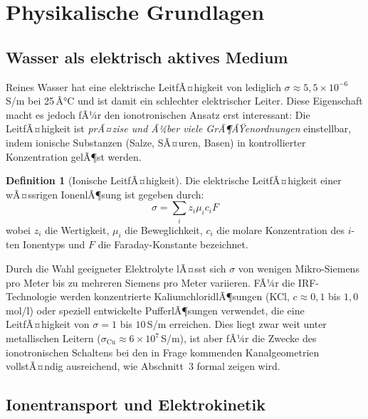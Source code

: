 ﻿\documentclass[a4paper,12pt]{scrreprt}
\theoremstyle{definition}
\newtheorem{definition}{Definition}[section]
\begin{document}
\section{Physikalische Grundlagen}

\subsection{Wasser als elektrisch aktives Medium}

Reines Wasser hat eine elektrische LeitfÃ¤higkeit von lediglich
$\sigma \approx 5{,}5 \times 10^{-6}$\,S/m bei 25\,Â°C und ist damit
ein schlechter elektrischer Leiter. Diese Eigenschaft macht es jedoch
fÃ¼r den ionotronischen Ansatz erst interessant: Die LeitfÃ¤higkeit ist
\emph{prÃ¤zise und Ã¼ber viele GrÃ¶ÃŸenordnungen} einstellbar, indem ionische
Substanzen (Salze, SÃ¤uren, Basen) in kontrollierter Konzentration gelÃ¶st werden.

\begin{definition}[Ionische LeitfÃ¤higkeit]
	Die elektrische LeitfÃ¤higkeit einer wÃ¤ssrigen IonenlÃ¶sung ist gegeben durch:
	\begin{equation}
		\sigma = \sum_i z_i \mu_i c_i F
		\label{eq:leitfaehigkeit}
	\end{equation}
	wobei $z_i$ die Wertigkeit, $\mu_i$ die Beweglichkeit, $c_i$ die molare
	Konzentration des $i$-ten Ionentyps und $F$ die Faraday-Konstante bezeichnet.
\end{definition}

Durch die Wahl geeigneter Elektrolyte lÃ¤sst sich $\sigma$ von wenigen
Mikro-Siemens pro Meter bis zu mehreren Siemens pro Meter variieren.
FÃ¼r die IRF-Technologie werden konzentrierte KaliumchloridlÃ¶sungen
(KCl, $c \approx 0{,}1$ bis $1{,}0$\,mol/l) oder speziell entwickelte
PufferlÃ¶sungen verwendet, die eine LeitfÃ¤higkeit von $\sigma = 1$ bis
$10$\,S/m erreichen. Dies liegt zwar weit unter metallischen Leitern
($\sigma_{\mathrm{Cu}} \approx 6 \times 10^7$\,S/m), ist aber fÃ¼r die
Zwecke des ionotronischen Schaltens bei den in Frage kommenden
Kanalgeometrien vollstÃ¤ndig ausreichend, wie Abschnitt~3 formal zeigen wird.

\subsection{Ionentransport und Elektrokinetik}
\end{document}

